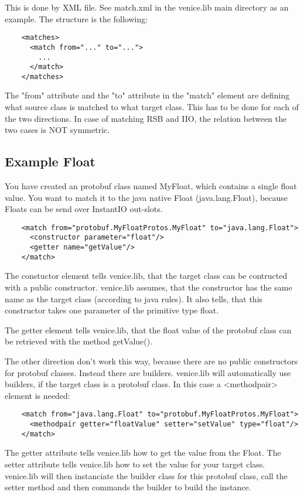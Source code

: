 \documentclass[german,a4paper]{article}
\begin{document}
This is done by XML file.  See match.xml in the venice.lib main directory as an example.  The structure is the following:
\begin{lstlisting}
    <matches>
      <match from="..." to="...">
        ...
      </match>
    </matches>
\end{lstlisting}
The "from" attribute and the "to" attribute in the "match" element are defining what source class is matched to what target class.  This has to be done for each of the two directions.  In case of matching RSB and IIO, the relation between the two cases is NOT symmetric.\\

\subsection{Example Float}

You have created an protobuf class named MyFloat, which contains a single float value.  You want to match it to the java native Float (java.lang.Float), because Floats can be send over InstantIO out-slots.
\begin{lstlisting}
    <match from="protobuf.MyFloatProtos.MyFloat" to="java.lang.Float">
      <constructor parameter="float"/>
      <getter name="getValue"/>
    </match>
\end{lstlisting}
The constuctor element tells venice.lib, that the target class can be contructed with a public constructor.  venice.lib assumes, that the constructor has the same name as the target class (according to java rules).  It also tells, that this constructor takes one parameter of the primitive type float.

The getter element tells venice.lib, that the float value of the protobuf class can be retrieved with the method getValue().

The other direction don't work this way, because there are no public constructors for protobuf classes.  Instead there are builders.  venice.lib will automatically use builders, if the target class is a protobuf class.  In this case a <methodpair> element is needed:
\begin{lstlisting}
    <match from="java.lang.Float" to="protobuf.MyFloatProtos.MyFloat">
      <methodpair getter="floatValue" setter="setValue" type="float"/>
    </match>
\end{lstlisting}
The getter attribute tells venice.lib how to get the value from the Float.  The setter attribute tells venice.lib how to set the value for your target class.  venice.lib will then instanciate the builder class for this protobuf class, call the setter method and then commands the builder to build the instance.\\
\end{document}
